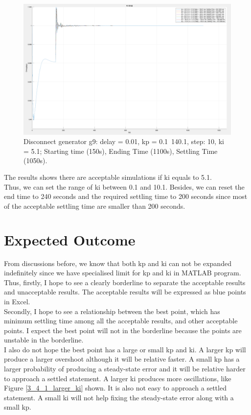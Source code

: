 \documentclass{report}
\begin{document}
\begin{figure}[htbp]
\centering
\includegraphics[width = .819\textwidth]{figure/4_1_2_c.png}
\caption{Disconnect generator g9: delay = 0.01, kp = 0.1~140.1, step: 10, ki = 5.1; Starting time (150s), Ending Time (1100s), Settling Time (1050s).}
\label{4_1_2_c}
\end{figure}

The results shows there are acceptable simulations if ki equals to 5.1. \\

Thus, we can set the range of ki between 0.1 and 10.1. 
Besides, we can reset the end time to 240 seconds and the required settling time to 200 seconds since most of the acceptable settling time are smaller than 200 seconds.\\

\section{Expected Outcome} %
From discussions before, we know that both kp and ki can not be expanded indefinitely since we have specialised limit for kp and ki in MATLAB program. Thus, firstly, I hope to see a clearly borderline to separate the acceptable results and unacceptable results. The acceptable results will be expressed as blue points in Excel. \\

Secondly, I hope to see a relationship between the best point, which has minimum settling time among all the acceptable results, and other acceptable points. I expect the best point will not in the borderline because the points are unstable in the borderline. \\

I also do not hope the best point has a large or small kp and ki. A larger kp will produce a larger overshoot although it will be relative faster. A small kp has a larger probability of producing a steady-state error and it will be relative harder to approach a settled statement. A larger ki produces more oscillations, like Figure \textcolor{red}{\ref{3_4_1_larger_ki}} shown. It is also not easy to approach a settled statement. A small ki will not help fixing the steady-state error along with a small kp. \\
\end{document}
